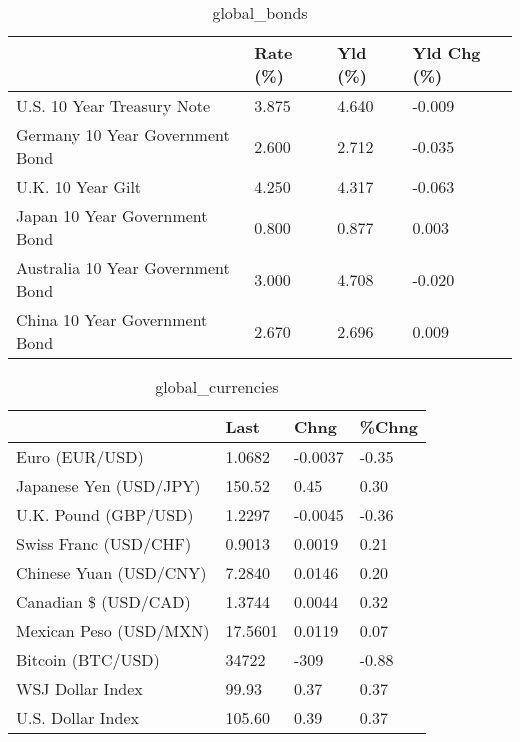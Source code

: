 \documentclass{article}%
\begin{document}
%


\begin{table}[htbp]%
\caption{global\_bonds}%
\centering%
\begin{adjustbox}{width=1\textwidth}%
\begin{tabular}{llll}
\toprule
                                  & Rate (\%) & Yld (\%) & Yld Chg (\%) \\
\midrule
       U.S. 10 Year Treasury Note &    3.875 &   4.640 &      -0.009 \\
  Germany 10 Year Government Bond &    2.600 &   2.712 &      -0.035 \\
                U.K. 10 Year Gilt &    4.250 &   4.317 &      -0.063 \\
    Japan 10 Year Government Bond &    0.800 &   0.877 &       0.003 \\
Australia 10 Year Government Bond &    3.000 &   4.708 &      -0.020 \\
    China 10 Year Government Bond &    2.670 &   2.696 &       0.009 \\
\bottomrule
\end{tabular}
%
\end{adjustbox}%
\end{table}

%


\begin{table}[htbp]%
\caption{global\_currencies}%
\centering%
\begin{adjustbox}{width=1\textwidth}%
\begin{tabular}{llll}
\toprule
                       &    Last &    Chng & \%Chng \\
\midrule
        Euro (EUR/USD) &  1.0682 & -0.0037 & -0.35 \\
Japanese Yen (USD/JPY) &  150.52 &    0.45 &  0.30 \\
  U.K. Pound (GBP/USD) &  1.2297 & -0.0045 & -0.36 \\
 Swiss Franc (USD/CHF) &  0.9013 &  0.0019 &  0.21 \\
Chinese Yuan (USD/CNY) &  7.2840 &  0.0146 &  0.20 \\
  Canadian \$ (USD/CAD) &  1.3744 &  0.0044 &  0.32 \\
Mexican Peso (USD/MXN) & 17.5601 &  0.0119 &  0.07 \\
     Bitcoin (BTC/USD) &   34722 &    -309 & -0.88 \\
      WSJ Dollar Index &   99.93 &    0.37 &  0.37 \\
     U.S. Dollar Index &  105.60 &    0.39 &  0.37 \\
\bottomrule
\end{tabular}
%
\end{adjustbox}%
\end{table}
\end{document}
